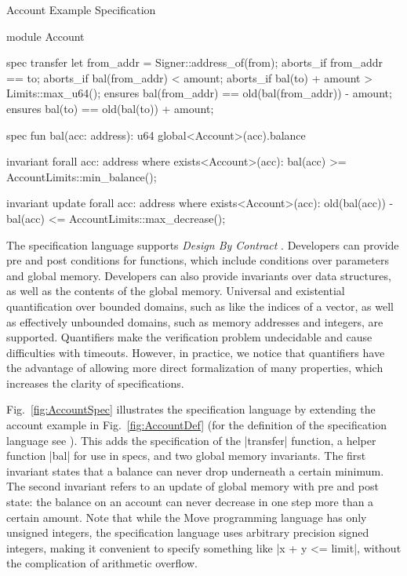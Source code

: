 \begin{Figure}
\caption{\label{fig:AccountSpec} Account Example Specification}
\begin{MoveBox}
module Account {
  spec transfer {
    let from_addr = Signer::address_of(from);
    aborts_if from_addr == to;
    aborts_if bal(from_addr) < amount;
    aborts_if bal(to) + amount > Limits::max_u64();
    ensures bal(from_addr) == old(bal(from_addr)) - amount;
    ensures bal(to) == old(bal(to)) + amount;
  }

  spec fun bal(acc: address): u64 {
    global<Account>(acc).balance
  }

  invariant forall acc: address where exists<Account>(acc):
    bal(acc) >= AccountLimits::min_balance();

  invariant update forall acc: address where exists<Account>(acc):
    old(bal(acc)) - bal(acc) <= AccountLimits::max_decrease();
}
\end{MoveBox}
\end{Figure}

\noindent The specification language supports {\em Design By Contract}
\cite{DESIGN_BY_CONTRACT}. Developers can provide pre and post conditions for
functions, which include conditions over
parameters and global
memory. Developers can also provide invariants over data structures, as well as
the
contents of the global memory.
%
Universal and existential
quantification %
over bounded domains, such as like the indices of a vector, as well as
effectively unbounded domains, such as memory addresses and integers, are
supported.
%
Quantifiers make the verification problem undecidable
and cause difficulties with timeouts.
%
However, in practice, we notice that quantifiers have the advantage
of allowing more direct formalization of many properties, which increases the
clarity of specifications.

Fig.~\ref{fig:AccountSpec} illustrates the specification language by extending
the account example in Fig.~\ref{fig:AccountDef} (for the definition of the
specification language see \cite{MOVE_SPEC_LANG_DEF}). This adds the
specification of the |transfer| function, a helper function |bal| for use in
specs, and two global memory invariants. The first invariant states that a
balance can never drop underneath a certain minimum. The second invariant refers
to an update of global memory with pre and post state: the balance on an account
can never decrease in one step more than a certain amount.  Note that while the
Move programming language has only unsigned integers, the specification language
uses arbitrary precision signed integers, making it convenient to specify
something like |x + y <= limit|,
without the complication of arithmetic overflow.

